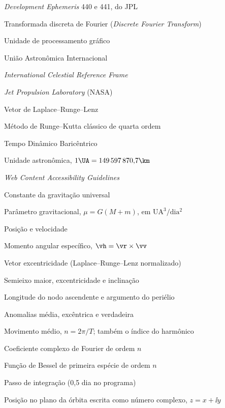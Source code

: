 \begin{siglas}
  \item[DE440/441] \textit{Development Ephemeris} 440 e 441, do JPL
  \item[DFT] Transformada discreta de Fourier (\textit{Discrete Fourier Transform})
  \item[GPU] Unidade de processamento gráfico
  \item[IAU] União Astronômica Internacional
  \item[ICRF] \textit{International Celestial Reference Frame}
  \item[JPL] \textit{Jet Propulsion Laboratory} (NASA)
  \item[LRL] Vetor de Laplace--Runge--Lenz
  \item[RK4] Método de Runge--Kutta clássico de quarta ordem
  \item[TDB] Tempo Dinâmico Baricêntrico
  \item[UA] Unidade astronômica, $1\UA = 149\,597\,870{,}7\km$
  \item[WCAG] \textit{Web Content Accessibility Guidelines}
\end{siglas}

\begin{simbolos}
  \item[$G$] Constante da gravitação universal
  \item[$\mu$] Parâmetro gravitacional, $\mu = G(M+m)$, em $\mathrm{UA^3/dia^2}$
  \item[$\vr,\ \vv$] Posição e velocidade
  \item[$\vh$] Momento angular específico, $\vh = \vr\times\vv$
  \item[$\ve$] Vetor excentricidade (Laplace--Runge--Lenz normalizado)
  \item[$a,\ e,\ i$] Semieixo maior, excentricidade e inclinação
  \item[$\Omega,\ \omega$] Longitude do nodo ascendente e argumento do periélio
  \item[$M,\ E,\ \nu$] Anomalias média, excêntrica e verdadeira
  \item[$n$] Movimento médio, $n = 2\pi/T$; também o índice do harmônico
  \item[$c_n$] Coeficiente complexo de Fourier de ordem $n$
  \item[$J_n$] Função de Bessel de primeira espécie de ordem $n$
  \item[$\Delta t$] Passo de integração (0,5 dia no programa)
  \item[$z(t)$] Posição no plano da órbita escrita como número complexo, $z = x + \ii y$
\end{simbolos}
